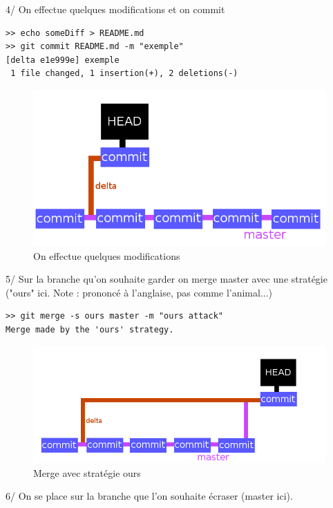 \documentclass[a4paper,10pt]{report}
\begin{document}
    4/ On effectue quelques modifications et on commit
\begin{verbatim}
>> echo someDiff > README.md 
>> git commit README.md -m "exemple"
[delta e1e999e] exemple
 1 file changed, 1 insertion(+), 2 deletions(-)
\end{verbatim}
\begin{figure}[h!]
  \begin{center}
    \includegraphics[scale=0.3]{images/4exp}
    \caption{On effectue quelques modifications}
    \label{4exp}
  \end{center}
\end{figure}
    5/ Sur la branche qu'on souhaite garder on merge master avec une strat\'egie ("ours" ici. Note : prononc\'e \`a l'anglaise, pas comme l'animal...)
\begin{verbatim}
>> git merge -s ours master -m "ours attack"
Merge made by the 'ours' strategy.
\end{verbatim}
\begin{figure}[h!]
  \begin{center}
    \includegraphics[scale=0.3]{images/5exp}
    \caption{Merge avec strat\'egie ours}
    \label{5exp}
  \end{center}
\end{figure}
    6/ On se place sur la branche que l'on souhaite \'ecraser (master ici). 
\end{document}
